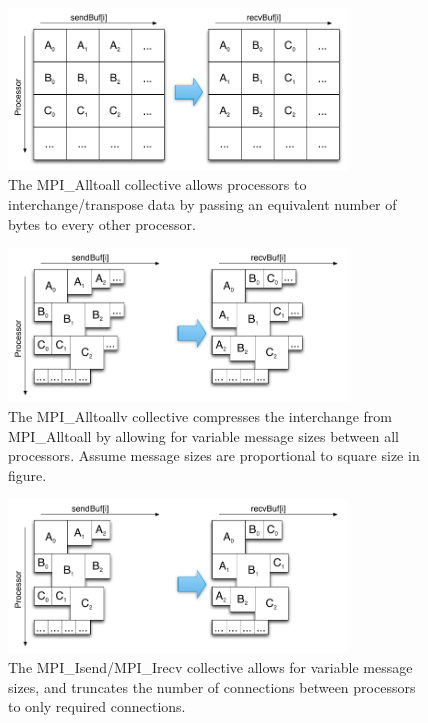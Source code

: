 \documentclass{report}
\begin{document}
\begin{figure}[ht!]
\begin{center}
\includegraphics[width=9cm]{../figures/omnigraffle/MPI_Alltoall_Visual.png}
\caption{The MPI\_Alltoall collective allows processors to interchange/transpose data by passing an equivalent number of bytes to every other processor.}
\label{fig:mpi_alltoall_visual}
\end{center}
\end{figure}
\begin{figure}[ht!]
\begin{center}
\includegraphics[width=9cm]{../figures/omnigraffle/MPI_Alltoallv_Visual.png}
\caption{The MPI\_Alltoallv collective compresses the interchange from MPI\_Alltoall by allowing for variable message sizes between all processors. Assume message sizes are proportional to square size in figure.}
\label{fig:mpi_alltoallv_visual}
\end{center}
\end{figure}
\begin{figure}[ht!]
\begin{center}
\includegraphics[width=9cm]{../figures/omnigraffle/MPI_IsendIrecv_Visual.png}
\caption{The MPI\_Isend/MPI\_Irecv collective allows for variable message sizes, and truncates the number of connections between processors to only required connections.}
\label{fig:mpi_isendirecv_visual}
\end{center}
\end{figure}
\end{document}
